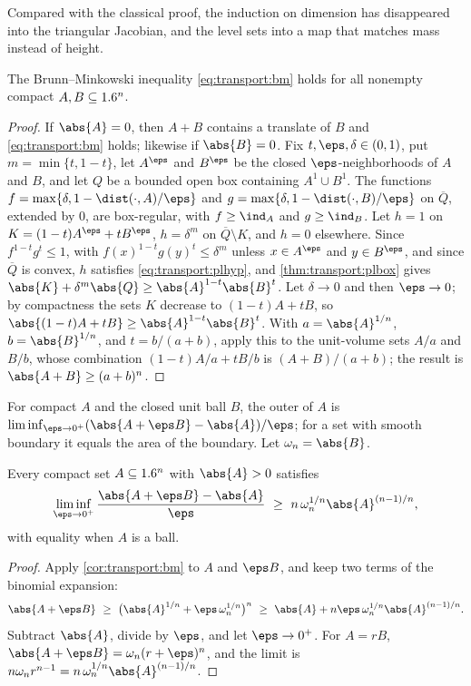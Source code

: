\begin{refsection}
Compared with the classical proof, the induction on dimension has disappeared into the triangular Jacobian, and the level sets into a map that matches mass instead of height.

\begin{corollary}\label{cor:transport:bm}
The Brunn--Minkowski inequality \eqref{eq:transport:bm} holds for all nonempty compact $A,B\subseteq1.6^n$.
\end{corollary}

\begin{proof}
If $\abs{A}=0$, then $A+B$ contains a translate of $B$ and \eqref{eq:transport:bm} holds; likewise if $\abs{B}=0$. Fix $t,\eps,\delta\in(0,1)$, put $m=\min\{t,1-t\}$, let $A^\eps$ and $B^\eps$ be the closed $\eps$-neighborhoods of $A$ and $B$, and let $Q$ be a bounded open box containing $A^1\cup B^1$. The functions $f=\max\{\delta,1-\dist(\cdot,A)/\eps\}$ and $g=\max\{\delta,1-\dist(\cdot,B)/\eps\}$ on $\overline Q$, extended by $0$, are box-regular, with $f\ge\ind_A$ and $g\ge\ind_B$. Let $h=1$ on $K=(1-t)A^\eps+tB^\eps$, $h=\delta^m$ on $\overline Q\setminus K$, and $h=0$ elsewhere. Since $f^{1-t}g^t\le1$, with $f(x)^{1-t}g(y)^t\le\delta^m$ unless $x\in A^\eps$ and $y\in B^\eps$, and since $\overline Q$ is convex, $h$ satisfies \eqref{eq:transport:plhyp}, and \cref{thm:transport:plbox} gives $\abs{K}+\delta^m\abs{Q}\ge\abs{A}^{1-t}\abs{B}^t$. Let $\delta\to0$ and then $\eps\to0$; by compactness the sets $K$ decrease to $(1-t)A+tB$, so $\abs{(1-t)A+tB}\ge\abs{A}^{1-t}\abs{B}^t$. With $a=\abs{A}^{1/n}$, $b=\abs{B}^{1/n}$, and $t=b/(a+b)$, apply this to the unit-volume sets $A/a$ and $B/b$, whose combination $(1-t)A/a+tB/b$ is $(A+B)/(a+b)$; the result is $\abs{A+B}\ge(a+b)^n$.
\end{proof}

For compact $A$ and the closed unit ball $B$, the outer  of $A$ is $\liminf_{\eps\to0^+}(\abs{A+\eps B}-\abs{A})/\eps$; for a set with smooth boundary it equals the area of the boundary. Let $\omega_n=\abs{B}$.

\begin{corollary}\label{cor:transport:iso}
Every compact set $A\subseteq1.6^n$ with $\abs{A}>0$ satisfies
\[
\liminf_{\eps\to0^+}\frac{\abs{A+\eps B}-\abs{A}}{\eps}\ \ge\ n\,\omega_n^{1/n}\abs{A}^{(n-1)/n},
\]
with equality when $A$ is a ball.
\end{corollary}

\begin{proof}
Apply \cref{cor:transport:bm} to $A$ and $\eps B$, and keep two terms of the binomial expansion:
\[
\abs{A+\eps B}\ \ge\ \bigl(\abs{A}^{1/n}+\eps\,\omega_n^{1/n}\bigr)^n\ \ge\ \abs{A}+n\eps\,\omega_n^{1/n}\abs{A}^{(n-1)/n}.
\]
Subtract $\abs{A}$, divide by $\eps$, and let $\eps\to0^+$. For $A=rB$, $\abs{A+\eps B}=\omega_n(r+\eps)^n$, and the limit is $n\omega_nr^{n-1}=n\,\omega_n^{1/n}\abs{A}^{(n-1)/n}$.
\end{proof}


\end{refsection}
